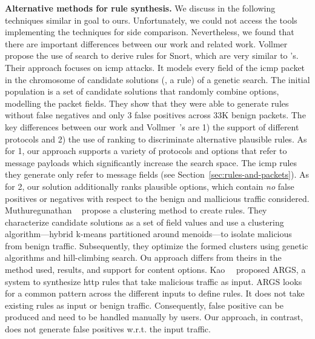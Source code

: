 \documentclass[conference]{IEEEtran}
\begin{document}
\noindent
\textbf{Alternative methods for rule synthesis.} We discuss in the
following techniques similar in goal to ours. Unfortunately, we could
not access the tools implementing the techniques for side
comparison. Nevertheless, we found that there are important
differences between our work and related work. Vollmer
\etal{}~\cite{vollmer-etal-cics2011} propose the use of search to
derive rules for Snort, which are very similar to \suri's.  Their
approach focuses on icmp attacks. It models every field of the icmp
packet in the chromosome of candidate solutions (\ie{}, a rule) of a
genetic search. The initial population is a set of candidate solutions
that randomly combine options, modelling the packet fields. They show
that they were able to generate rules without false negatives and only
3 false positives across 33K benign packets. The key differences
between our work and Vollmer~\etal{}'s are 1) the support of different
protocols and 2) the use of ranking to discriminate alternative
plausible rules. As for 1, our approach supports a variety of
protocols and options that refer to message payloads which
significantly increase the search space. The icmp rules they generate only
refer to message fields (see Section~\ref{sec:rules-and-packets}).
As for 2, our solution additionally ranks plausible options, which
contain \emph{no} false positives or negatives with respect to the
benign and mallicious traffic considered. Muthuregunathan
\etal{}~\cite{muthuregunathan-etal2009} propose a clustering method to
create rules. They characterize candidate solutions as a set of field
values and use a clustering algorithm---hybrid k-means partitioned
around menoids---to isolate malicious from benign
traffic. Subsequently, they optimize the formed clusters using genetic
algorithms and hill-climbing search. Ou approach differs from theirs
in the method used, results, and support for content
options. Kao~\etal~\cite{Kao2015AutomaticNR} proposed ARGS, a system
to synthesize http rules that take malicious traffic as input. ARGS
looks for a common pattern across the different inputs to define
rules. It does not take existing rules as input or benign
traffic. Consequently, false positive can be produced and need to be
handled manually by users. Our approach, in contrast, does not
generate false positives w.r.t. the input traffic.

\end{document}
